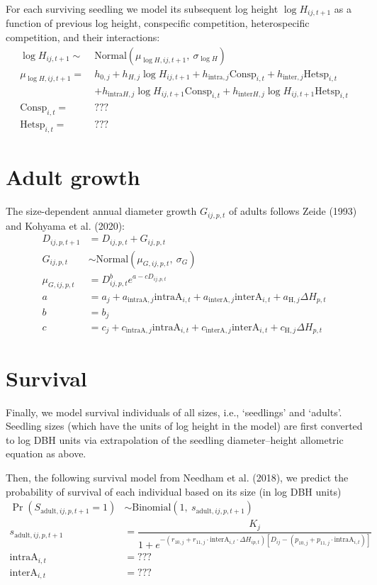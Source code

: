 \documentclass[12pt,a4paper]{article}
\begin{document}
For each surviving seedling we model its subsequent log height $\log H_{ij,t+1}$ as a function of previous log height, conspecific competition, heterospecific competition, and their interactions:
\begin{align}
\log H_{ij,t+1} \sim~& \text{Normal}(\mu_{\log H, ij,t+1},~\sigma_{\log H}) \\
\mu_{\log H, ij,t+1} =~& h_{0,j} + h_{H,j} \log H_{ij,t+1} + h_{\text{intra},j}\text{Consp}_{i,t} + h_{\text{inter},j}\text{Hetsp}_{i,t} \\
& + h_{\text{intra}H,j}\log H_{ij,t+1}\text{Consp}_{i,t} + h_{\text{inter}H,j}\log H_{ij,t+1}\text{Hetsp}_{i,t} \\
\text{Consp}_{i,t} =~& ??? \\
\text{Hetsp}_{i,t} =~& ???
\end{align}

\section{Adult growth}
The size-dependent annual diameter growth $G_{ij,p,t}$ of adults follows Zeide (1993) and Kohyama et al. (2020):
\begin{align}
D_{ij,p,t+1} &= D_{ij,p,t} + G_{ij,p,t}\\
G_{ij,p,t} &\sim \text{Normal}(\mu_{G,ij,p,t},~\sigma_{G}) \\
\mu_{G,ij,p,t} &= D_{ij,p,t}^{b} e^{a-c D_{ij,p,t}} \\
a &= a_j + a_{\text{intraA},j} \text{intraA}_{i,t} + a_{\text{interA},j} \text{interA}_{i,t} + a_{\text{H},j} \Delta H_{p,t} \\
b &= b_j \\
c &= c_j + c_{\text{intraA},j} \text{intraA}_{i,t} + c_{\text{interA},j} \text{interA}_{i,t} + c_{\text{H},j} \Delta H_{p,t}
\end{align}

\section{Survival}
Finally, we model survival individuals of all sizes, i.e., `seedlings' and `adults'. Seedling sizes (which have the units of log height in the model) are first converted to log DBH units via extrapolation of the seedling diameter--height allometric equation as above.

Then, the following survival model from Needham et al. (2018), we predict the probability of survival of each individual based on its size (in log DBH units)
\begin{align}
\Pr(S_{\text{adult},ij,p,t+1} = 1) &\sim \text{Binomial}(1,~s_{\text{adult},ij,p,t+1}) \\
s_{\text{adult},ij,p,t+1} &=
    \dfrac{K_j}{1 + e^{-(r_{10,j} + r_{11,j} \cdot \text{interA}_{i,t} \cdot \Delta H_{ip,t}) [D_{ij} - (p_{10,j} + p_{11,j} \cdot \text{intraA}_{i,t}) ]}} \\
\text{intraA}_{i,t} &= ??? \\
\text{interA}_{i,t} &= ???
\end{align}
\end{document}
